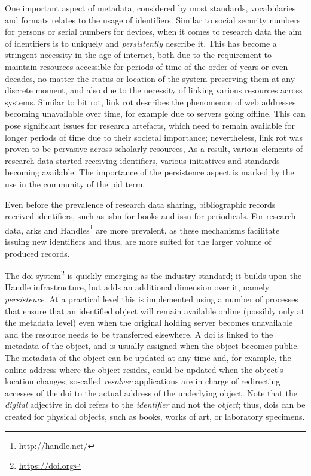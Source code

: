 One important aspect of metadata, considered by most standards, vocabularies and formats relates to the usage of identifiers. Similar to social security numbers for persons or serial numbers for devices, when it comes to research data the aim of identifiers is to uniquely and \emph{persistently} describe it. This has become a stringent necessity in the age of internet, both due to the requirement to maintain resources accessible for periods of time of the order of years or even decades, no matter the status or location of the system preserving them at any discrete moment, and also due to the necessity of linking various resources across systems. Similar to bit rot, link rot describes the phenomenon of web addresses becoming unavailable over time, for example due to servers going offline. This can pose significant issues for research artefacts, which need to remain available for longer periods of time due to their societal importance; nevertheless, link rot was proven to be pervasive across scholarly resources\cite{sanderson}, As a result, various elements of research data started receiving identifiers, various initiatives and standards becoming available. The importance of the persistence aspect is marked by the use in the community of the \gls{pid} term.

Even before the prevalence of research data sharing, bibliographic records received identifiers, such as \gls{isbn} for books and \gls{issn} for periodicals. For research data, \glspl{ark} and Handles\footnote{\url{http://handle.net/}} are more prevalent, as these mechanisms facilitate issuing new identifiers and thus, are more suited for the larger volume of produced records.

The \gls{doi} system\footnote{\url{https://doi.org}} is quickly emerging as the industry standard; it builds upon the Handle infrastructure, but adds an additional dimension over it, namely \emph{persistence}\cite{doihandle}. At a practical level this is implemented using a number of processes that ensure that an identified object will remain available online (possibly only at the metadata level) even when the original holding server becomes unavailable and the resource needs to be transferred elsewhere. A \gls{doi} is linked to the metadata of the object, and is usually assigned when the object becomes public. The metadata of the object can be updated at any time and, for example, the online address where the object resides, could be updated when the object's location changes; so-called \emph{resolver} applications are in charge of redirecting accesses of the \gls{doi} to the actual address of the underlying object. Note that the \emph{digital} adjective in \gls{doi} refers to the \emph{identifier} and not the \emph{object}; thus, \glspl{doi} can be created for physical objects, such as books, works of art, or laboratory specimens.


